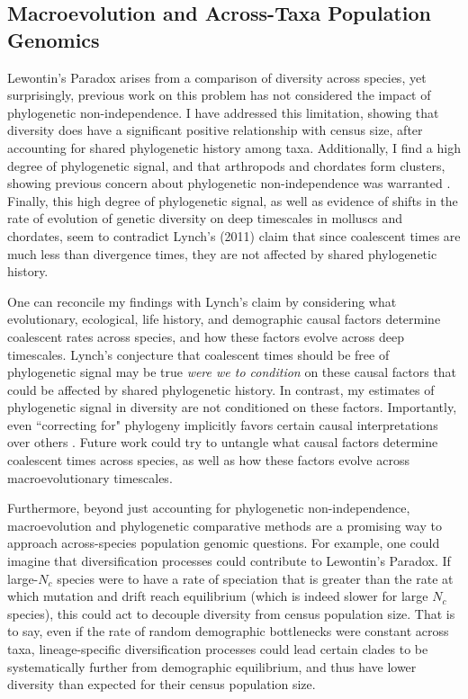 \documentclass[11pt]{article}
\begin{document}
\subsection*{Macroevolution and Across-Taxa Population Genomics}


Lewontin's Paradox arises from a comparison of diversity across species, yet
surprisingly, previous work on this problem has not considered the impact of
phylogenetic non-independence. I have addressed this limitation, showing that
diversity does have a significant positive relationship with census size, after
accounting for shared phylogenetic history among taxa. Additionally, I find a
high degree of phylogenetic signal, and that arthropods and chordates form
clusters, showing previous concern about phylogenetic non-independence was
warranted \parencite{Gillespie1991-qa}. Finally, this high degree of
phylogenetic signal, as well as evidence of shifts in the rate of evolution of
genetic diversity on deep timescales in molluscs and chordates, seem to
contradict Lynch's (2011) claim that since coalescent times are much less than
divergence times, they are not affected by shared phylogenetic history. 

One can reconcile my findings with Lynch's claim by considering what
evolutionary, ecological, life history, and demographic causal factors
determine coalescent rates across species, and how these factors evolve across
deep timescales. Lynch's conjecture that coalescent times should be free of
phylogenetic signal may be true \emph{were we to condition} on these causal
factors that could be affected by shared phylogenetic history. In contrast, my
estimates of phylogenetic signal in diversity are not conditioned on these
factors. Importantly, even ``correcting for" phylogeny implicitly favors
certain causal interpretations over others
\parencite{Westoby1995-wz,Uyeda2018-wf}. Future work could try to untangle what
causal factors determine coalescent times across species, as well as how these
factors evolve across macroevolutionary timescales.

Furthermore, beyond just accounting for phylogenetic non-independence,
macroevolution and phylogenetic comparative methods are a promising way to
approach across-species population genomic questions.  For example, one could
imagine that diversification processes could contribute to Lewontin's Paradox.
If large-$N_c$ species were to have a rate of speciation that is greater than
the rate at which mutation and drift reach equilibrium (which is indeed slower
for large $N_c$ species), this could act to decouple diversity from census
population size. That is to say, even if the rate of random demographic
bottlenecks were constant across taxa, lineage-specific diversification
processes could lead certain clades to be systematically further from
demographic equilibrium, and thus have lower diversity than expected for their
census population size. 
\end{document}
